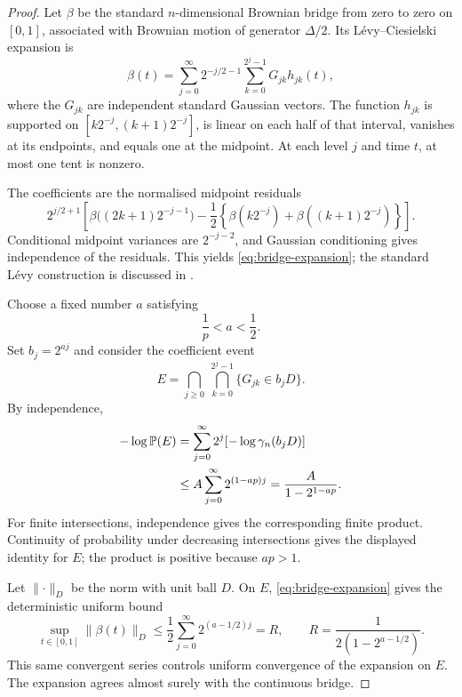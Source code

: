 \documentclass[11pt]{amsart}
\numberwithin{equation}{section}
\theoremstyle{definition}
\theoremstyle{remark}
\newcommand{\Prob}{\mathbb P}
\newcommand{\gam}{\gamma_n}
\newcommand{\norm}[1]{\lVert #1\rVert}
\begin{document}
\begin{proof}
Let \(\beta\) be the standard \(n\)-dimensional Brownian bridge from
zero to zero on \([0,1]\), associated with Brownian motion of generator
\(\Delta/2\). Its L\'evy--Ciesielski expansion is
\begin{equation}\label{eq:bridge-expansion}
\beta(t)=\sum_{j=0}^\infty 2^{-j/2-1}
 \sum_{k=0}^{2^j-1}G_{jk}h_{jk}(t),
\end{equation}
where the \(G_{jk}\) are independent standard Gaussian vectors.
The function \(h_{jk}\) is supported on
\([k2^{-j},(k+1)2^{-j}]\), is linear on each half of that interval,
vanishes at its endpoints, and equals one at the midpoint.
At each level \(j\) and time \(t\), at most one tent is nonzero.

The coefficients are the normalised midpoint residuals
\[
2^{j/2+1}\left[
 \beta\bigl((2k+1)2^{-j-1}\bigr)
 -\frac12\left\{\beta(k2^{-j})+\beta((k+1)2^{-j})\right\}
\right].
\]
Conditional midpoint variances are \(2^{-j-2}\), and Gaussian
conditioning gives independence of the residuals. This yields
\eqref{eq:bridge-expansion}; the standard L\'evy construction is discussed
in \cite[Section~1.1.2]{MP10}.

Choose a fixed number \(a\) satisfying
\begin{equation}\label{eq:choice-a}
\frac1p<a<\frac12.
\end{equation}
Set \(b_j=2^{aj}\) and consider the coefficient event
\[
E=\bigcap_{j\ge0}\ \bigcap_{k=0}^{2^j-1}\{G_{jk}\in b_jD\}.
\]
By independence,
\begin{align}
-\log\Prob(E)
&=\sum_{j=0}^\infty 2^j[-\log\gam(b_jD)]\notag\\
&\le A\sum_{j=0}^\infty2^{(1-ap)j}
=\frac{A}{1-2^{1-ap}}.
\label{eq:bridge-probability}
\end{align}
For finite intersections, independence gives the corresponding finite
product. Continuity of probability under decreasing intersections gives
the displayed identity for \(E\); the product is positive because
\(ap>1\).

Let \(\norm{\cdot}_D\) be the norm with unit ball \(D\).
On \(E\), \eqref{eq:bridge-expansion} gives the deterministic uniform
bound
\begin{equation}\label{eq:bridge-radius}
\sup_{t\in[0,1]}\norm{\beta(t)}_D
\le\frac12\sum_{j=0}^\infty2^{(a-1/2)j}
=R,\qquad
R=\frac1{2(1-2^{a-1/2})}.
\end{equation}
This same convergent series controls uniform convergence of the
expansion on \(E\). The expansion agrees almost surely with the
continuous bridge.


\end{proof}
\end{document}
